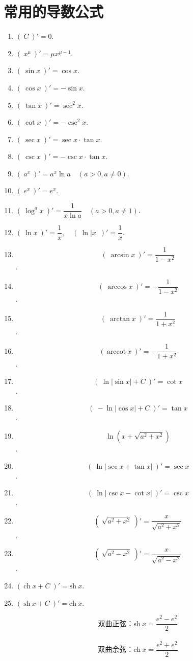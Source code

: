 \documentclass[lang=cn,10pt]{elegantbook}
\newcommand{\arccot}{\mathrm{arccot}}
\newcommand{\sh}{\mathrm{sh}\ }%
\newcommand{\ch}{\mathrm{ch}\ }%
\begin{document}
\chapter{常用的导数公式}
\begin{enumerate}
	\item \( (\ C\ )' = 0 \).
	\item \( (\ x^{\mu}\ )' = \mu x^{\mu - 1} \).
	\item \( (\ \sin x\ )' = \cos x \).
	\item \( (\ \cos x \ )' = -\sin x \).
	\item \( (\ \tan x \ )' = \sec^{2}x \).
	\item \( (\ \cot x \ )' = -\csc^{2}x \).
	\item \( (\ \sec x \ )' = \sec x \cdot \tan x \).
	\item \( (\ \csc x \ )' = -\csc x \cdot \tan x \).
	\item \( (\ a^{x}\ )' = a^{x}\ln a\quad(a > 0, a\neq0) \).
	\item \( (\ e^{x}\ )' = e^{x} \).
	\item \( (\ \log^{a}x\ )' = \dfrac{1}{x\ln a}\quad(a>0,a\neq 1) \).
	\item \( (\ \ln x\ )' = \dfrac{1}{x},\quad (\ \ln |x|\ )' = \dfrac{1}{x} \).
	\item \[ (\ \arcsin x\ )' = \dfrac{1}{1 - x^{2}} \].
	\item \[ (\ \arccos x\ )' = -\dfrac{1}{1 - x^{2}} \].
	\item \[ (\ \arctan x\ )' = \dfrac{1}{1 + x^{2}} \].
	\item \[ (\ \arccot\ x\ )' = -\dfrac{1}{1 +x^{2}} \].
	\item \[ (\ \ln |\sin x| + C\ )' = \cot x \].
	\item \[ (\ -\ln |\cos x|+ C\ )' = \tan x \].
	\item \[ \ln \left(x + \sqrt{a^{2} + x^{2}}\right) \].
	\item \[ (\ \ln |\sec x + \tan x|\ )' = \sec x \].
	\item \[ (\ \ln |\csc x - \cot x|\ )' = \csc x \].
	\item \[ (\ \sqrt{a^{2} + x^{2}} \ )' = \dfrac{x}{\sqrt{a^{2} + x^{2}}} \].
	\item \[ (\ \sqrt{a^{2} - x^{2}} \ )' = \dfrac{x}{\sqrt{a^{2} - x^{2}}} \].
	\item \( (\ \ch x + C \ )' = \sh x \).
	\item \( (\ \sh x + C \ )' = \ch x \).\\
	\begin{remark}
		\[ \text{双曲正弦：} \sh x = \dfrac{e^{2} - e^{2}}{2} \] \\
		\[ \text{双曲余弦：} \ch x = \dfrac{e^{2} + e^{2}}{2} \]
	\end{remark}
\end{enumerate}
\end{document}

